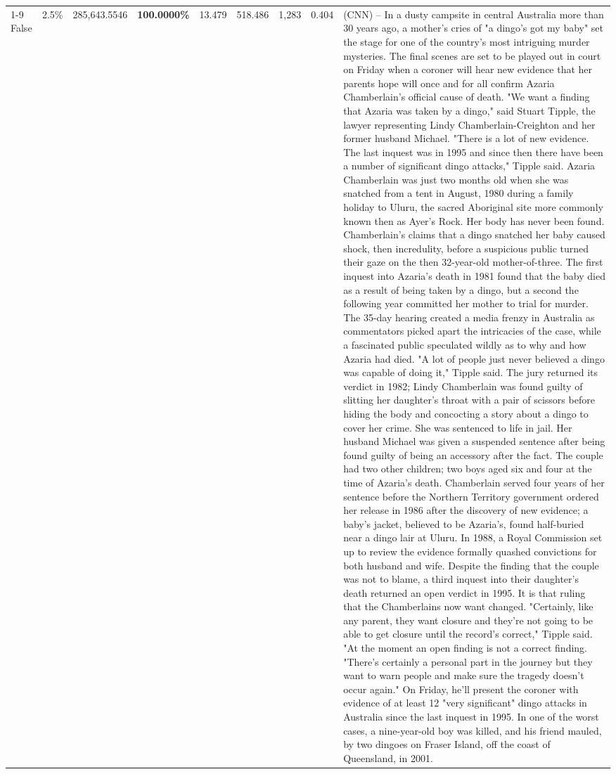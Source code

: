 \begin{table}[H]
\begin{tabular}{lllrlllll}
\cline{1-9}
False & 2.5\% & \color{red} 285,643.5546 & \bfseries \color{red} 100.0000\% & 13.479 & 518.486 & 1,283 & 0.404 & (CNN) -- In a dusty campsite in central Australia more than 30 years ago, a mother's cries of "a dingo's got my baby" set the stage for one of the country's most intriguing murder mysteries. The final scenes are set to be played out in court on Friday when a coroner will hear new evidence that her parents hope will once and for all confirm Azaria Chamberlain's official cause of death. "We want a finding that Azaria was taken by a dingo," said Stuart Tipple, the lawyer representing Lindy Chamberlain-Creighton and her former husband Michael. "There is a lot of new evidence. The last inquest was in 1995 and since then there have been a number of significant dingo attacks," Tipple said. Azaria Chamberlain was just two months old when she was snatched from a tent in August, 1980 during a family holiday to Uluru, the sacred Aboriginal site more commonly known then as Ayer's Rock. Her body has never been found. Chamberlain's claims that a dingo snatched her baby caused shock, then incredulity, before a suspicious public turned their gaze on the then 32-year-old mother-of-three. The first inquest into Azaria's death in 1981 found that the baby died as a result of being taken by a dingo, but a second the following year committed her mother to trial for murder. The 35-day hearing created a media frenzy in Australia as commentators picked apart the intricacies of the case, while a fascinated public speculated wildly as to why and how Azaria had died. "A lot of people just never believed a dingo was capable of doing it," Tipple said. The jury returned its verdict in 1982; Lindy Chamberlain was found guilty of slitting her daughter's throat with a pair of scissors before hiding the body and concocting a story about a dingo to cover her crime. She was sentenced to life in jail. Her husband Michael was given a suspended sentence after being found guilty of being an accessory after the fact. The couple had two other children; two boys aged six and four at the time of Azaria's death. Chamberlain served four years of her sentence before the Northern Territory government ordered her release in 1986 after the discovery of new evidence; a baby's jacket, believed to be Azaria's, found half-buried near a dingo lair at Uluru. In 1988, a Royal Commission set up to review the evidence formally quashed convictions for both husband and wife. Despite the finding that the couple was not to blame, a third inquest into their daughter's death returned an open verdict in 1995. It is that ruling that the Chamberlains now want changed. "Certainly, like any parent, they want closure and they're not going to be able to get closure until the record's correct," Tipple said. "At the moment an open finding is not a correct finding. "There's certainly a personal part in the journey but they want to warn people and make sure the tragedy doesn't occur again." On Friday, he'll present the coroner with evidence of at least 12 "very significant" dingo attacks in Australia since the last inquest in 1995. In one of the worst cases, a nine-year-old boy was killed, and his friend mauled, by two dingoes on Fraser Island, off the coast of Queensland, in 2001. 
\end{tabular}
\end{table}
